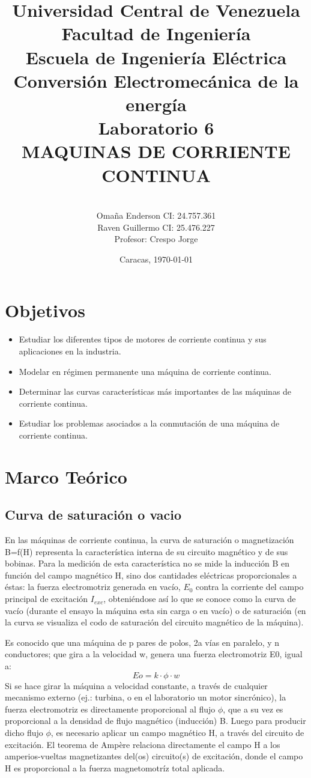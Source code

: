 \documentclass[11pt,letterpaper]{article}     %
\author{\\Omaña Enderson CI:  24.757.361 \\Raven Guillermo CI: 25.476.227\\Profesor: Crespo Jorge \vspace*{1in}}
\title{Universidad Central de Venezuela\\{ Facultad de Ingeniería\\Escuela de Ingeniería Eléctrica\\ Conversión Electromecánica de la energía\\\vspace*{1.5in} }Laboratorio 6\\MAQUINAS DE CORRIENTE CONTINUA\vspace*{1.35in}}
\date{Caracas, \today}
\begin{document}
\maketitle							%
\newpage
\tableofcontents
\newpage
\section{Objetivos}
\begin{itemize}
	\item Estudiar los diferentes tipos de motores de corriente continua y sus
    aplicaciones en la industria.
	\item Modelar en régimen permanente una máquina de corriente continua.
	\item Determinar las curvas características más importantes de las máquinas de
    corriente continua.
    \item Estudiar los problemas asociados a la conmutación de una máquina de
    corriente continua.
\end{itemize}
\section{Marco Teórico}
\subsection{Curva de saturación o vacio}
En las máquinas de corriente continua, la curva de saturación o magnetización
B=f(H) representa la característica interna de su circuito magnético y de sus
bobinas. Para la medición de esta característica no se mide la inducción B en
función del campo magnético H, sino dos cantidades eléctricas proporcionales a
éstas: la fuerza electromotriz generada en vacío, $E_{0}$ contra la corriente del campo principal de excitación $I_{exc}$, obteniéndose así lo que se conoce como la curva de vacío (durante el ensayo la máquina esta sin carga o en vacío) o de saturación (en la curva se visualiza el codo de saturación del circuito magnético de la máquina).

Es conocido que una máquina de p pares de polos, 2a vías en paralelo, y n
conductores; que gira a la velocidad w, genera una fuerza electromotriz E0, igual
a:
\begin{equation}
    Eo = k\cdot \phi \cdot w
\end{equation}
Si se hace girar la máquina a velocidad constante, a través de cualquier
mecanismo externo (ej.: turbina, o en el laboratorio un motor sincrónico), la fuerza electromotriz es directamente proporcional al flujo $\phi$, que a su vez es proporcional a la densidad de flujo magnético (inducción) B. Luego para producir dicho flujo $\phi$, es necesario aplicar un campo magnético H, a través del circuito de excitación. El teorema de Ampère relaciona directamente el campo H a los amperios-vueltas magnetizantes del(os) circuito(s) de excitación, donde el campo H es proporcional a la fuerza magnetomotríz total aplicada.
\end{document}
